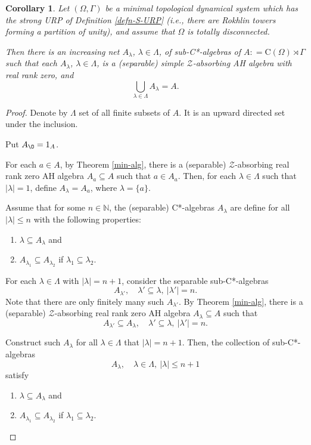 \documentclass[12pt, oneside, psamsfonts]{amsart}
\newtheorem{cor}[thm]{Corollary}
\theoremstyle{definition}
\theoremstyle{remark}
\numberwithin{equation}{section}
\newcommand{\abs}[1]{\left\vert#1\right\vert}
\begin{document}
\begin{cor}\label{AH-structure}
Let $(\Omega, \Gamma)$ be a minimal topological dynamical system which has the strong URP of Definition \ref{defn-S-URP} (i.e., there are Rokhlin towers forming a partition of unity), and assume that $\Omega$ is totally disconnected. 

Then there is an increasing net $A_\lambda$, $\lambda \in \Lambda$, of sub-C*-algebras of $A: = \mathrm{C}(\Omega) \rtimes \Gamma$ such that 
each $A_\lambda$, $\lambda \in \Lambda$, is a  (separable) simple $\mathcal Z$-absorbing AH algebra with real rank zero, and $$\bigcup_{\lambda \in \Lambda} A_\lambda  = A. $$
\end{cor}
\begin{proof}
Denote by $\Lambda$ set of all finite subsets of $A$. It is an upward directed set under the inclusion. 

Put $A_{\O} = 1_A$.

For each $a \in A$, by Theorem \ref{min-alg}, there is a (separable) $\mathcal Z$-absorbing real rank zero AH algebra $A_a \subseteq A$ such that $a \in A_a$. Then, for each $\lambda \in \Lambda$ such that $\abs{\lambda} = 1$, define $A_\lambda = A_a$, where $\lambda = \{a\}$.

Assume that for some $n\in \mathbb N$, the (separable) C*-algebras $A_\lambda$ are define for all $\abs{\lambda} \leq n$ with the following properties: 
\begin{enumerate}
\item[(1)] $\lambda \subseteq A_\lambda$ and
\item[(2)] $A_{\lambda_1} \subseteq A_{\lambda_2}$ if $\lambda_1 \subseteq \lambda_2$.
\end{enumerate}

For each $\lambda \in \Lambda$ with $\abs{\lambda} = n+1$, consider the separable sub-C*-algebras $$A_{\lambda'},\quad \lambda' \subseteq \lambda,\ \abs{\lambda'} = n. $$
Note that there are only finitely many such $A_{\lambda'}$. By Theorem \ref{min-alg}, there is a (separable) $\mathcal Z$-absorbing real rank zero AH algebra $A_\lambda \subseteq A$ such that 
$$A_{\lambda'} \subseteq A_\lambda, \quad \lambda' \subseteq \lambda,\ \abs{\lambda'} = n.$$ 

Construct such $A_\lambda$ for all $\lambda \in \Lambda$ that $\abs{\lambda} = n+1$. Then, the collection of sub-C*-algebras $$A_\lambda, \quad \lambda \in \Lambda,\ \abs{\lambda} \leq n+1$$ satisfy 
\begin{enumerate}
\item[(1')] $\lambda \subseteq A_\lambda$ and
\item[(2')] $A_{\lambda_1} \subseteq A_{\lambda_2}$ if $\lambda_1 \subseteq \lambda_2$.
\end{enumerate}


\end{proof}
\end{document}
